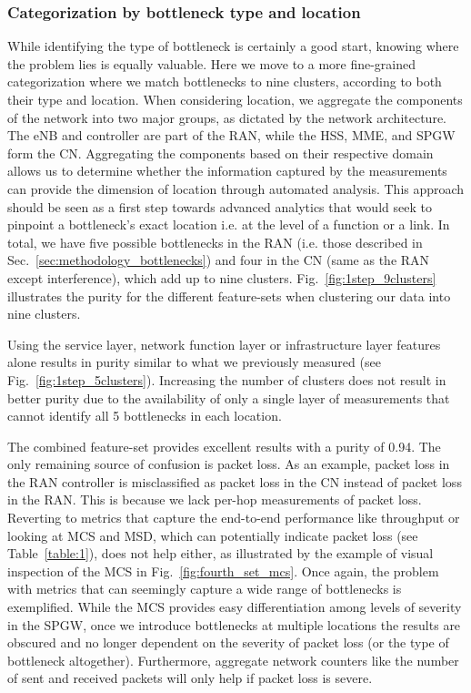 \documentclass[journal,comsoc]{IEEEtran}
\begin{document}
%
\subsubsection{Categorization by bottleneck type and location}
\label{sec:bottlenecks_1step9}

%
While identifying the type of bottleneck is certainly a good start, knowing where the problem lies is equally valuable.
Here we move to a more fine-grained categorization where we match bottlenecks to nine clusters, according to both their type and location.
When considering location, we aggregate the components of the network into two major groups, as dictated by the network architecture. The eNB and controller are part of the RAN, while the HSS, MME, and SPGW form the CN. Aggregating the components based on their respective domain allows us to determine whether the information captured by the measurements can provide the dimension of location through automated analysis. This approach should be seen as a first step towards advanced analytics that would seek to pinpoint a bottleneck's exact location i.e. at the level of a function or a link.
In total, we have five possible bottlenecks in the RAN (i.e. those described in Sec.~\ref{sec:methodology_bottlenecks}) and four in the CN (same as the RAN except interference), which add up to nine clusters.
Fig.~\ref{fig:1step_9clusters} illustrates the purity for the different feature-sets when clustering our data into nine clusters.

%
Using the service layer, network function layer or infrastructure layer features alone results in purity similar to what we previously measured (see Fig.~\ref{fig:1step_5clusters}).
Increasing the number of clusters does not result in better purity due to the availability of only a single layer of measurements that cannot identify all 5 bottlenecks in each location.

% 
The combined feature-set provides excellent results with a purity of 0.94.
The only remaining source of confusion is packet loss.
As an example, packet loss in the RAN controller is misclassified as packet loss in the CN instead of packet loss in the RAN.
This is because we lack per-hop measurements of packet loss.
Reverting to metrics that capture the end-to-end performance like throughput or looking at MCS and MSD, which can potentially indicate packet loss (see Table~\ref{table:1}), does not help either, as illustrated by the example of visual inspection of the MCS in Fig.~\ref{fig:fourth_set_mcs}.
Once again, the problem with metrics that can seemingly capture a wide range of bottlenecks is exemplified.
While the MCS provides easy differentiation among levels of severity in the SPGW, once we introduce bottlenecks at multiple locations the results are obscured and no longer dependent on the severity of packet loss (or the type of bottleneck altogether).
Furthermore, aggregate network counters like the number of sent and received packets will only help if packet loss is severe.
\end{document}

